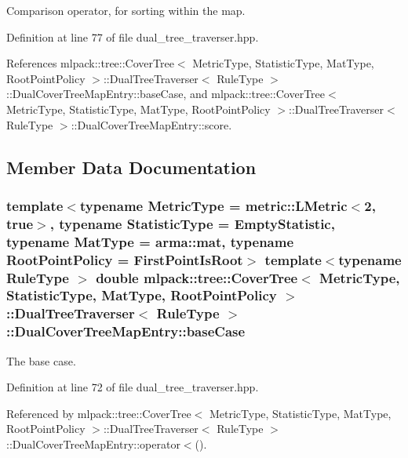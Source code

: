 Comparison operator, for sorting within the map. 



Definition at line 77 of file dual\+\_\+tree\+\_\+traverser.\+hpp.



References mlpack\+::tree\+::\+Cover\+Tree$<$ Metric\+Type, Statistic\+Type, Mat\+Type, Root\+Point\+Policy $>$\+::\+Dual\+Tree\+Traverser$<$ Rule\+Type $>$\+::\+Dual\+Cover\+Tree\+Map\+Entry\+::base\+Case, and mlpack\+::tree\+::\+Cover\+Tree$<$ Metric\+Type, Statistic\+Type, Mat\+Type, Root\+Point\+Policy $>$\+::\+Dual\+Tree\+Traverser$<$ Rule\+Type $>$\+::\+Dual\+Cover\+Tree\+Map\+Entry\+::score.



\subsection{Member Data Documentation}
\subsubsection[{base\+Case}]{\setlength{\rightskip}{0pt plus 5cm}template$<$typename Metric\+Type  = metric\+::\+L\+Metric$<$2, true$>$, typename Statistic\+Type  = Empty\+Statistic, typename Mat\+Type  = arma\+::mat, typename Root\+Point\+Policy  = First\+Point\+Is\+Root$>$ template$<$typename Rule\+Type $>$ double {\bf mlpack\+::tree\+::\+Cover\+Tree}$<$ Metric\+Type, Statistic\+Type, Mat\+Type, Root\+Point\+Policy $>$\+::{\bf Dual\+Tree\+Traverser}$<$ Rule\+Type $>$\+::Dual\+Cover\+Tree\+Map\+Entry\+::base\+Case}\label{structmlpack_1_1tree_1_1CoverTree_1_1DualTreeTraverser_1_1DualCoverTreeMapEntry_a2db06a18b31dd0c01063304d3a1c3052}


The base case. 



Definition at line 72 of file dual\+\_\+tree\+\_\+traverser.\+hpp.



Referenced by mlpack\+::tree\+::\+Cover\+Tree$<$ Metric\+Type, Statistic\+Type, Mat\+Type, Root\+Point\+Policy $>$\+::\+Dual\+Tree\+Traverser$<$ Rule\+Type $>$\+::\+Dual\+Cover\+Tree\+Map\+Entry\+::operator$<$().

